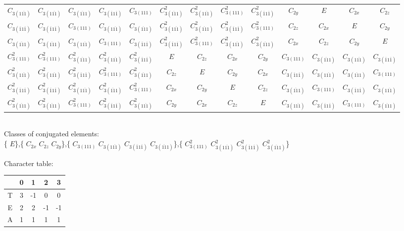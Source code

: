 \documentclass[12pt]{report}
\begin{document}
\begin{tabular}{c | c c c c c c c c c c c c }
$C_{3(1\overline{11})}$& $C_{3(1\overline{11})}$& $C_{3(\overline{11}1)}$& $C_{3(\overline{1}1\overline{1})}$& $C_{3(111)}$& $C_{3(\overline{11}1)}^2$& $C_{3(1\overline{11})}^2$& $C_{3(111)}^2$& $C_{3(\overline{1}1\overline{1})}^2$& $C_{2y}$& $E$& $C_{2x}$& $C_{2z}$\\
$C_{3(\overline{1}1\overline{1})}$& $C_{3(\overline{1}1\overline{1})}$& $C_{3(111)}$& $C_{3(1\overline{11})}$& $C_{3(\overline{11}1)}$& $C_{3(1\overline{11})}^2$& $C_{3(\overline{11}1)}^2$& $C_{3(\overline{1}1\overline{1})}^2$& $C_{3(111)}^2$& $C_{2z}$& $C_{2x}$& $E$& $C_{2y}$\\
$C_{3(\overline{11}1)}$& $C_{3(\overline{11}1)}$& $C_{3(1\overline{11})}$& $C_{3(111)}$& $C_{3(\overline{1}1\overline{1})}$& $C_{3(\overline{1}1\overline{1})}^2$& $C_{3(111)}^2$& $C_{3(1\overline{11})}^2$& $C_{3(\overline{11}1)}^2$& $C_{2x}$& $C_{2z}$& $C_{2y}$& $E$\\
$C_{3(111)}^2$& $C_{3(111)}^2$& $C_{3(\overline{11}1)}^2$& $C_{3(1\overline{11})}^2$& $C_{3(\overline{1}1\overline{1})}^2$& $E$& $C_{2z}$& $C_{2x}$& $C_{2y}$& $C_{3(111)}$& $C_{3(\overline{11}1)}$& $C_{3(1\overline{11})}$& $C_{3(\overline{1}1\overline{1})}$\\
$C_{3(1\overline{11})}^2$& $C_{3(1\overline{11})}^2$& $C_{3(\overline{1}1\overline{1})}^2$& $C_{3(111)}^2$& $C_{3(\overline{11}1)}^2$& $C_{2z}$& $E$& $C_{2y}$& $C_{2x}$& $C_{3(\overline{1}1\overline{1})}$& $C_{3(1\overline{11})}$& $C_{3(\overline{11}1)}$& $C_{3(111)}$\\
$C_{3(\overline{1}1\overline{1})}^2$& $C_{3(\overline{1}1\overline{1})}^2$& $C_{3(1\overline{11})}^2$& $C_{3(\overline{11}1)}^2$& $C_{3(111)}^2$& $C_{2x}$& $C_{2y}$& $E$& $C_{2z}$& $C_{3(\overline{11}1)}$& $C_{3(111)}$& $C_{3(\overline{1}1\overline{1})}$& $C_{3(1\overline{11})}$\\
$C_{3(\overline{11}1)}^2$& $C_{3(\overline{11}1)}^2$& $C_{3(111)}^2$& $C_{3(\overline{1}1\overline{1})}^2$& $C_{3(1\overline{11})}^2$& $C_{2y}$& $C_{2x}$& $C_{2z}$& $E$& $C_{3(1\overline{11})}$& $C_{3(\overline{1}1\overline{1})}$& $C_{3(111)}$& $C_{3(\overline{11}1)}$\\
\end{tabular}

\\
Classes of conjugated elements:
\\
\{ $E$\},\{ $C_{2x}$ $C_{2z}$ $C_{2y}$\},\{ $C_{3(111)}$ $C_{3(1\overline{11})}$ $C_{3(\overline{1}1\overline{1})}$ $C_{3(\overline{11}1)}$\},\{ $C_{3(111)}^2$ $C_{3(1\overline{11})}^2$ $C_{3(\overline{1}1\overline{1})}^2$ $C_{3(\overline{11}1)}^2$\}

Character table:


\begin{tabular}{c | c c c c } 
& 0& 1& 2& 3\\ 
 \hline 
 T& 3& -1& 0& 0\\
E& 2& 2& -1& -1\\
A& 1& 1& 1& 1\\
\end{tabular}
\end{document}
